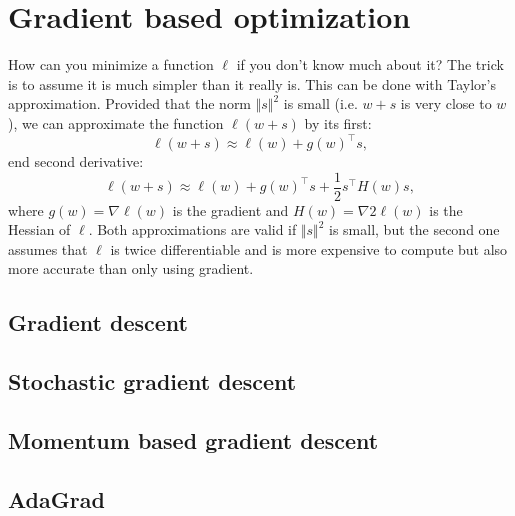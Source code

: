 \section{Gradient based optimization}
\label{sec:gradient}
How can you minimize a function $\ell$ if you don't know much about it? 
The trick is to assume it is much simpler than it really is. This can be done with 
Taylor's approximation. Provided that the norm $\Vert s \Vert^{2}$ is small 
(i.e. $w + s$ is very close to $w$), we can approximate the function $\ell (w+s)$ by its 
first: 
\begin{equation}
	\label{equ:first_and_second_derivative}
	\ell(w+s) \approx \ell(w) + g(w)^{\top}s,
\end{equation}
end second derivative:
\begin{equation}
	\label{equ:first_and_second_derivative}
	\ell(w+s) \approx \ell(w) + g(w)^{\top}s + \frac{1}{2}s^{\top}H(w)s,
\end{equation}
where $g(w)=\nabla \ell (w)$ is the gradient and $H(w)=\nabla 2 \ell (w)$ 
is the Hessian of $\ell$.
Both approximations are valid if $\Vert s\Vert^{2}$ is small, but the second one assumes that
$\ell$ is twice differentiable and is more expensive to compute but also more accurate 
than only using gradient. 

\subsection{Gradient descent}
\subsection{Stochastic gradient descent}
\subsection{Momentum based gradient descent}
\subsection{AdaGrad}
